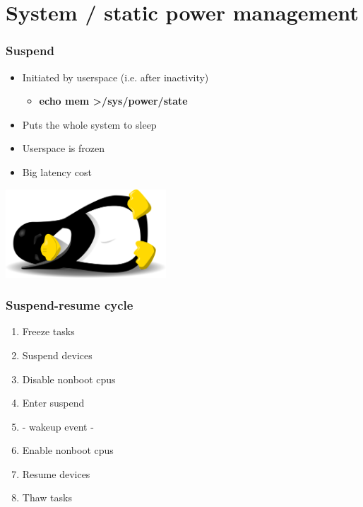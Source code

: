\documentclass{beamer}
\begin{document}
\section{System / static power management}
\begin{frame}
\frametitle{Suspend}
\begin{itemize}
	\item Initiated by userspace (i.e. after inactivity)
	\begin{itemize}
		\item \textbf{echo mem \textgreater /sys/power/state}
	\end{itemize}
	\item Puts the whole system to sleep
	\item Userspace is frozen
	\item Big latency cost
\end{itemize}
\begin{center}
\includegraphics[width=6cm]{media/tuxsleep.png}
\end{center}
\end{frame}

\begin{frame}
\frametitle{Suspend-resume cycle}
\begin{enumerate}
	\item Freeze tasks
	\item Suspend devices
	\item Disable nonboot cpus
	\item Enter suspend
	\item - wakeup event - 
	\item Enable nonboot cpus
	\item Resume devices
	\item Thaw tasks
\end{enumerate}
\end{frame}
\end{document}
